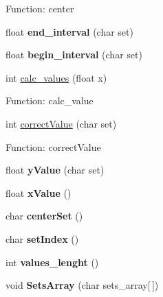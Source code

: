 \begin{DoxyCompactItemize}
\begin{DoxyCompactList}
 Function\-: center \end{DoxyCompactList}\item 
\hypertarget{classMOFSVar_aa7ba78ad79bf140a42c367ef05be648f}{float {\bfseries end\-\_\-interval} (char set)}\label{classMOFSVar_aa7ba78ad79bf140a42c367ef05be648f}

\item 
\hypertarget{classMOFSVar_a0405137f03966974d1cd3b17188100ef}{float {\bfseries begin\-\_\-interval} (char set)}\label{classMOFSVar_a0405137f03966974d1cd3b17188100ef}

\item 
int \hyperlink{classMOFSVar_ad665d5d1786c1debe0f20717d1b8631f}{calc\-\_\-values} (float x)
\begin{DoxyCompactList}\small\item\em 

 Function\-: calc\-\_\-value \end{DoxyCompactList}\item 
int \hyperlink{classMOFSVar_ab5cfcd921ef13fe24235bcd5f1904f7f}{correct\-Value} (char set)
\begin{DoxyCompactList}\small\item\em 

 Function\-: correct\-Value \end{DoxyCompactList}\item 
\hypertarget{classMOFSVar_a7f5697cd6cbd7775f96b2d2d57fc349b}{float {\bfseries y\-Value} (char set)}\label{classMOFSVar_a7f5697cd6cbd7775f96b2d2d57fc349b}

\item 
\hypertarget{classMOFSVar_adb1180ae8b4859a13b7c08e0dc6cd534}{float {\bfseries x\-Value} ()}\label{classMOFSVar_adb1180ae8b4859a13b7c08e0dc6cd534}

\item 
\hypertarget{classMOFSVar_ac4ee40300142f2de17f7a5768eeb91cf}{char {\bfseries center\-Set} ()}\label{classMOFSVar_ac4ee40300142f2de17f7a5768eeb91cf}

\item 
\hypertarget{classMOFSVar_a9fe171574d43bf5c18cab9020e595821}{char {\bfseries set\-Index} ()}\label{classMOFSVar_a9fe171574d43bf5c18cab9020e595821}

\item 
\hypertarget{classMOFSVar_ae764a9e694df6c3fe4c14dfb42dac33c}{int {\bfseries values\-\_\-lenght} ()}\label{classMOFSVar_ae764a9e694df6c3fe4c14dfb42dac33c}

\item 
\hypertarget{classMOFSVar_a0954088bf76d28616ac58ef9499c4b8c}{void {\bfseries Sets\-Array} (char sets\-\_\-array\mbox{[}$\,$\mbox{]})}\label{classMOFSVar_a0954088bf76d28616ac58ef9499c4b8c}


\end{DoxyCompactItemize}
